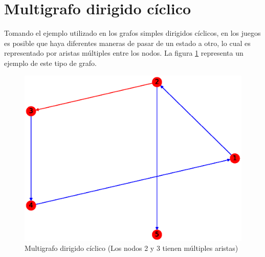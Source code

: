 \documentclass{article}
\begin{document}

\section{Multigrafo dirigido cíclico}
Tomando el ejemplo utilizado en los grafos simples dirigidos cíclicos, en los juegos es posible que haya diferentes maneras de pasar de un estado a otro, lo cual es representado por aristas múltiples entre los nodos. La figura \ref{fig:MDC} representa un ejemplo de este tipo de grafo.
\begin{figure}[H]
    \includegraphics[width=\textwidth]{11-MDC}
    \caption{Multigrafo dirigido cíclico (Los nodos 2 y 3 tienen múltiples aristas)}
    \label{fig:MDC}
\end{figure}



\end{document}
